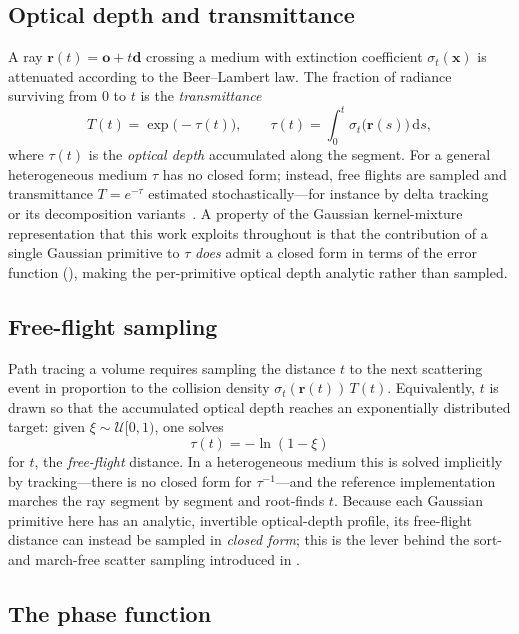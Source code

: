 \subsection{Optical depth and transmittance}

A ray $\bm{r}(t)=\bm{o}+t\bm{d}$ crossing a medium with extinction coefficient
$\sigma_t(\bm{x})$ is attenuated according to the Beer--Lambert law. The fraction of radiance
surviving from $0$ to $t$ is the \emph{transmittance}
\[
  T(t) = \exp\!\big(-\tau(t)\big), \qquad
  \tau(t) = \int_0^{t} \sigma_t\big(\bm{r}(s)\big)\,\mathrm{d}s,
\]
where $\tau(t)$ is the \emph{optical depth} accumulated along the segment. For a general
heterogeneous medium $\tau$ has no closed form; instead, free flights are sampled and transmittance
$T = e^{-\tau}$ estimated stochastically---for instance by delta tracking~\cite{Woodcock1965} or its
decomposition variants~\cite{Kutz2017}. A property of
the Gaussian kernel-mixture representation that this work exploits throughout is that the
contribution of a single Gaussian primitive to $\tau$ \emph{does} admit a closed form in terms of
the error function (), making the per-primitive optical depth analytic
rather than sampled.

\subsection{Free-flight sampling}

Path tracing a volume requires sampling the distance $t$ to the next scattering event in proportion
to the collision density $\sigma_t(\bm{r}(t))\,T(t)$. Equivalently, $t$ is drawn so that the
accumulated optical depth reaches an exponentially distributed target: given $\xi\sim\mathcal{U}[0,1)$,
one solves
\[
  \tau(t) = -\ln(1-\xi)
\]
for $t$, the \emph{free-flight} distance. In a heterogeneous medium this is solved implicitly by
tracking---there is no closed form for $\tau^{-1}$---and the reference implementation marches the ray
segment by segment and root-finds $t$. Because each Gaussian primitive here has an analytic,
invertible optical-depth profile, its free-flight distance can instead be sampled in \emph{closed
form}; this is the lever behind the sort- and march-free scatter sampling introduced in
.

\subsection{The phase function}

